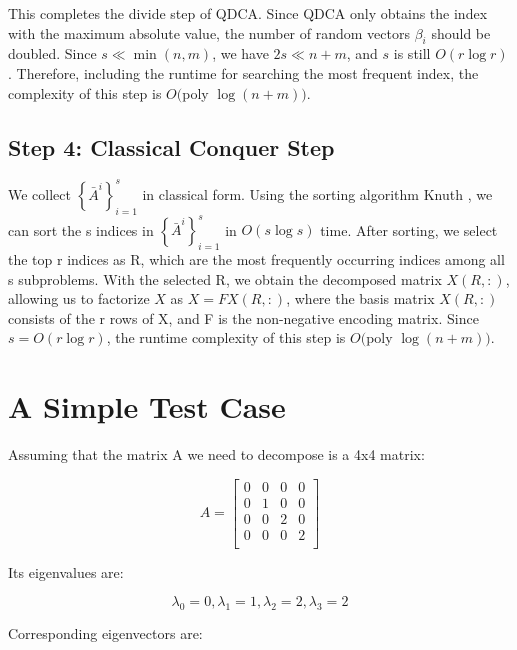 \documentclass[12pt]{article}
\begin{document}
This completes the divide step of QDCA. Since QDCA only obtains the index with the maximum absolute value, the number of random vectors $\beta_{i}$ should be doubled. Since $s \ll \min (n, m)$, we have $2 s \ll n+m$, and $s$ is still $O(r \log r)$. Therefore, including the runtime for searching the most frequent index, the complexity of this step is $O($poly $\log (n+m))$.

\subsection{Step 4: Classical Conquer Step}

We collect $\left\{\bar{A}^{i}\right\}_{i=1}^{s}$ in classical form. Using the sorting algorithm Knuth \cite{knuth1997art}, we can sort the s indices in $\left\{\bar{A}^{i}\right\}_{i=1}^{s}$ in $O(s \log s)$ time. After sorting, we select the top r indices as R, which are the most frequently occurring indices among all s subproblems. With the selected R, we obtain the decomposed matrix $X(R,:)$, allowing us to factorize $X$ as $X=F X(R,:)$, where the basis matrix $X(R,:)$ consists of the r rows of X, and F is the non-negative encoding matrix. Since $s=O(r \log r)$, the runtime complexity of this step is $O($poly $\log (n+m))$.



\section{A Simple Test Case}

Assuming that the matrix A we need to decompose is a 4x4 matrix:

$$
A = \begin{bmatrix}
0 & 0 & 0 & 0 \\
0 & 1 & 0 & 0 \\
0 & 0 & 2 & 0 \\
0 & 0 & 0 & 2 \\
\end{bmatrix}
$$

Its eigenvalues are:

$$
\lambda_0 = 0, \lambda_1 = 1, \lambda_2 = 2, \lambda_3 = 2
$$

Corresponding eigenvectors are:
\end{document}
